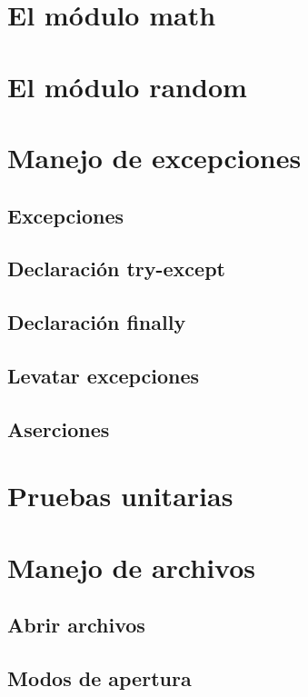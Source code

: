 \documentclass{report}
\begin{document}
\clearpage\chapter{El módulo math}

\clearpage\chapter{El módulo random}

\clearpage\chapter{Manejo de excepciones}

\section{Excepciones}

\section{Declaración try-except}

\section{Declaración finally}

\section{Levatar excepciones}

\section{Aserciones}

\clearpage\chapter{Pruebas unitarias}

\clearpage\chapter{Manejo de archivos}

\section{Abrir archivos}

\section{Modos de apertura}
\end{document}
